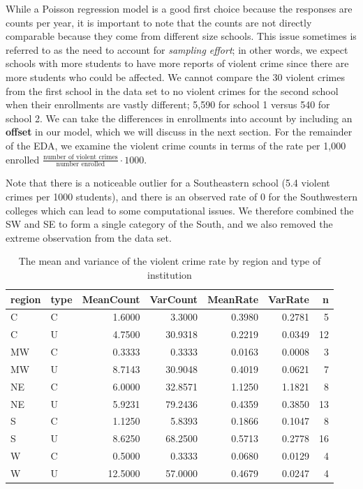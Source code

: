 \documentclass[
]{krantz}
\begin{document}
While a Poisson regression model is a good first choice because the responses are counts per year, it is important to note that the counts are not directly comparable because they come from different size schools. This issue sometimes is referred to as the need to account for \emph{sampling effort}; in other words, we expect schools with more students to have more reports of violent crime since there are more students who could be affected. We cannot compare the 30 violent crimes from the first school in the data set to no violent crimes for the second school when their enrollments are vastly different; 5,590 for school 1 versus 540 for school 2. We can take the differences in enrollments into account by including an \textbf{offset} in our model, which we will discuss in the next section. For the remainder of the EDA, we examine the violent crime counts in terms of the rate per 1,000 enrolled \(\frac{\textrm{number of violent crimes}}{\textrm{number enrolled}} \cdot 1000\).

Note that there is a noticeable outlier for a Southeastern school (5.4 violent crimes per 1000 students), and there is an observed rate of 0 for the Southwestern colleges which can lead to some computational issues. We therefore combined the SW and SE to form a single category of the South, and we also removed the extreme observation from the data set.

\begin{table}[t]

\caption{\label{tab:table4ch4}The mean and variance of the violent crime rate by region and type of institution}
\centering
\begin{tabular}{llrrrrr}
\toprule
region & type & MeanCount & VarCount & MeanRate & VarRate & n\\
\midrule
C & C & 1.6000 & 3.3000 & 0.3980 & 0.2781 & 5\\
C & U & 4.7500 & 30.9318 & 0.2219 & 0.0349 & 12\\
MW & C & 0.3333 & 0.3333 & 0.0163 & 0.0008 & 3\\
MW & U & 8.7143 & 30.9048 & 0.4019 & 0.0621 & 7\\
NE & C & 6.0000 & 32.8571 & 1.1250 & 1.1821 & 8\\
\addlinespace
NE & U & 5.9231 & 79.2436 & 0.4359 & 0.3850 & 13\\
S & C & 1.1250 & 5.8393 & 0.1866 & 0.1047 & 8\\
S & U & 8.6250 & 68.2500 & 0.5713 & 0.2778 & 16\\
W & C & 0.5000 & 0.3333 & 0.0680 & 0.0129 & 4\\
W & U & 12.5000 & 57.0000 & 0.4679 & 0.0247 & 4\\
\bottomrule
\end{tabular}
\end{table}
\end{document}
